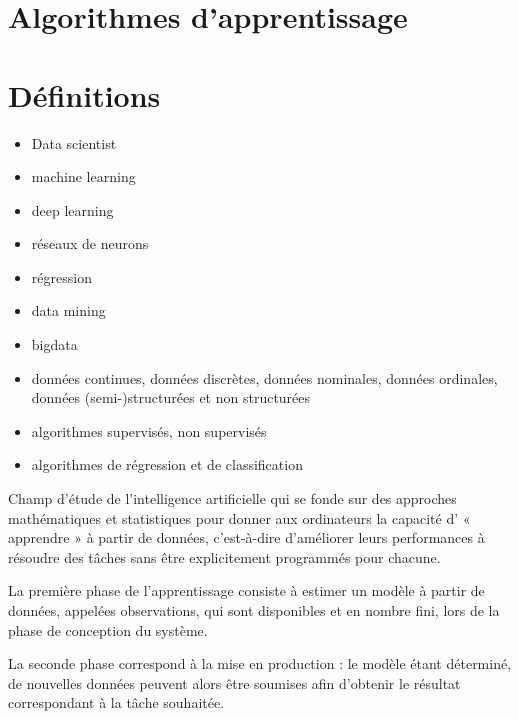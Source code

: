 \section{Algorithmes d'apprentissage}




\newpage

\section{Définitions}

\begin{itemize}
\item Data scientist
\item machine learning
\item deep learning
\item réseaux de neurons
\item régression
\item data mining
\item bigdata
\item données continues, données discrètes, données nominales, données ordinales, données (semi-)structurées et non structurées

\end{itemize}


\begin{itemize}
\item algorithmes supervisés, non supervisés
\item algorithmes de régression et de classification
\end{itemize}

\begin{defi} 
Champ d'étude de l'intelligence artificielle qui se fonde sur des approches mathématiques et statistiques pour donner aux ordinateurs la capacité d' « apprendre » à partir de données, c'est-à-dire d'améliorer leurs performances à résoudre des tâches sans être explicitement programmés pour chacune. 

La première phase de l'apprentissage consiste à estimer un modèle à partir de données, appelées observations, qui sont disponibles et en nombre fini, lors de la phase de conception du système.

 La seconde phase correspond à la mise en production : le modèle étant déterminé, de nouvelles données peuvent alors être soumises afin d'obtenir le résultat correspondant à la tâche souhaitée.
\end{defi}



